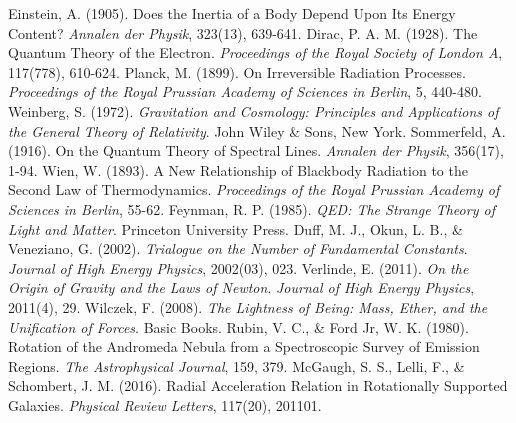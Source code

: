 \documentclass[12pt,a4paper]{article}
\begin{document}
\begin{thebibliography}{99}
		 Einstein, A. (1905). Does the Inertia of a Body Depend Upon Its Energy Content? \textit{Annalen der Physik}, 323(13), 639-641.
		 Dirac, P. A. M. (1928). The Quantum Theory of the Electron. \textit{Proceedings of the Royal Society of London A}, 117(778), 610-624.
		 Planck, M. (1899). On Irreversible Radiation Processes. \textit{Proceedings of the Royal Prussian Academy of Sciences in Berlin}, 5, 440-480.
		 Weinberg, S. (1972). \textit{Gravitation and Cosmology: Principles and Applications of the General Theory of Relativity}. John Wiley \& Sons, New York.
		 Sommerfeld, A. (1916). On the Quantum Theory of Spectral Lines. \textit{Annalen der Physik}, 356(17), 1-94.
		 Wien, W. (1893). A New Relationship of Blackbody Radiation to the Second Law of Thermodynamics. \textit{Proceedings of the Royal Prussian Academy of Sciences in Berlin}, 55-62.
		 Feynman, R. P. (1985). \textit{QED: The Strange Theory of Light and Matter}. Princeton University Press.
		 Duff, M. J., Okun, L. B., \& Veneziano, G. (2002). \textit{Trialogue on the Number of Fundamental Constants}. \textit{Journal of High Energy Physics}, 2002(03), 023.
		 Verlinde, E. (2011). \textit{On the Origin of Gravity and the Laws of Newton}. \textit{Journal of High Energy Physics}, 2011(4), 29.
		 Wilczek, F. (2008). \textit{The Lightness of Being: Mass, Ether, and the Unification of Forces}. Basic Books.
		 Rubin, V. C., \& Ford Jr, W. K. (1980). Rotation of the Andromeda Nebula from a Spectroscopic Survey of Emission Regions. \textit{The Astrophysical Journal}, 159, 379.
		 McGaugh, S. S., Lelli, F., \& Schombert, J. M. (2016). Radial Acceleration Relation in Rotationally Supported Galaxies. \textit{Physical Review Letters}, 117(20), 201101.
	\end{thebibliography}
	
\end{document}
